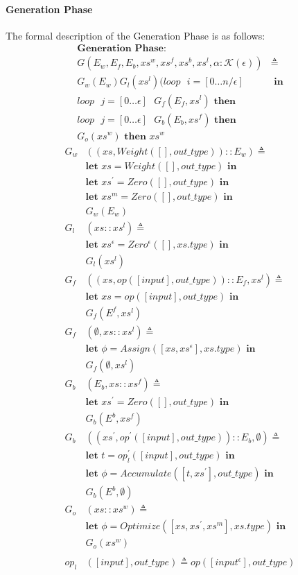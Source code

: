\documentclass[sigplan, nonacm]{acmart}\settopmatter{printfolios=true,printccs=false,printacmref=false}
\begin{document}
\paragraph{Generation Phase}
The formal description of the Generation Phase is as follows:
\begin{align*}
  \textbf{Generation Phase}: \qquad \qquad& \\
  G(E_w,E_f,E_b, xs^w,xs^f,xs^b,xs^l,\alpha:\mathcal{K} (\epsilon))& \triangleq \\
  G_w(E_w)G_l(xs^l)(loop \text{  } i=[0\dots n/\epsilon] &\textbf{ in}\\
  loop \text{  }j=[0\dots \epsilon]\text{ }G_f(E_f, xs^l) \textbf{ then}&\\
  loop \text{  }j=[0\dots \epsilon]\text{ }G_b(E_b, xs^f) \textbf{ then}&\\
  G_o(xs^w) \textbf{ then } xs^w\quad \qquad \qquad&
\end{align*}
\begin{align*}
  G_w&((xs, Weight([], out\_type))::E_w)\triangleq\\
  &\textbf{let } xs=Weight([], out\_type) \textbf{ in}\\
  &\textbf{let } xs^\prime=Zero([], out\_type) \textbf{ in}\\
  &\textbf{let } xs^m=Zero([], out\_type) \textbf{ in}\\
  &G_w(E_w)\\
  G_l&(xs::xs^l)\triangleq\\
  &\textbf{let } xs^\epsilon=Zero^\epsilon([], xs.type) \textbf{ in}\\
  &G_l(xs^l)\\
  G_f&((xs, op([input], out\_type))::E_f, xs^l)\triangleq\\
  &\textbf{let } xs=op([input], out\_type) \textbf{ in}\\
  &G_f(E^f, xs^l)\\
  G_f&(\emptyset, xs::xs^l)\triangleq\\
  &\textbf{let } \phi=Assign([xs, xs^\epsilon], xs.type) \textbf{ in}\\
  &G_f(\emptyset, xs^l)\\
  G_b&(E_b, xs::xs^f)\triangleq\\
  &\textbf{let } xs^\prime=Zero([], out\_type) \textbf{ in}\\
  &G_b(E^b, xs^f)\\
  G_b&((xs^\prime, op^\prime([input], out\_type))::E_b, \emptyset)\triangleq\\
  &\textbf{let } t=op^\prime_l([input], out\_type) \textbf{ in}\\
  &\textbf{let } \phi=Accumulate([t, xs^\prime], out\_type) \textbf{ in}\\
  &G_b(E^b, \emptyset)\\
  G_o&(xs::xs^w)\triangleq\\
  &\textbf{let } \phi=Optimize([xs,xs^\prime,xs^m], xs.type) \textbf{ in}\\
  &G_o(xs^w)\\
  \\
  op_l&([input],out\_type) \triangleq op([input^\epsilon], out\_type)
\end{align*}
\end{document}
